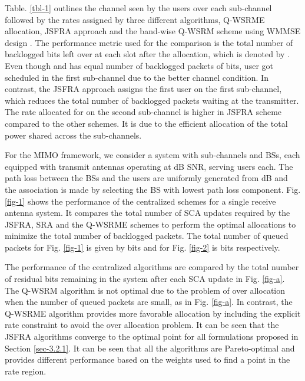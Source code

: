 Table. \ref{tbl-1} outlines the channel seen by the users over each sub-channel followed by the rates assigned by three different algorithms, \ac{Q-WSRME} allocation, \ac{JSFRA} approach and the band-wise \ac{Q-WSRM} scheme using \ac{WMMSE} design \cite{wmmse_shi}. The performance metric used for the comparison is the total number of backlogged bits left over at each slot after the allocation, which is denoted by . Even though  and  has equal number of backlogged packets of  bits, user  got scheduled in the first sub-channel due to the better channel condition. In contrast, the \ac{JSFRA} approach assigns the first user on the first sub-channel, which reduces the total number of backlogged packets waiting at the transmitter. The rate allocated for  on the second sub-channel is higher in \ac{JSFRA} scheme compared to the other schemes. It is due to the efficient allocation of the total power shared across the sub-channels.

For the \ac{MIMO} framework, we consider a system with  sub-channels and  \acp{BS}, each equipped with  transmit antennas operating at dB \ac{SNR}, serving  users each. The path loss between the \acp{BS} and the users are uniformly generated from \me{[0,-3]} dB and the association is made by selecting the \ac{BS} with lowest path loss component. Fig. \ref{fig-1} shows the performance of the centralized schemes for a single receive antenna system. It compares the total number of \ac{SCA} updates required by the \ac{JSFRA}, \ac{SRA} and the \ac{Q-WSRME} schemes to perform the optimal allocations to minimize the total number of backlogged packets. The total number of queued packets for Fig. \ref{fig-1} is given by  bits and for Fig. \ref{fig-2} is  bits respectively.
\begin{figure*}
\centering
{}
\hfill
{}
\caption{Number of backlogged packets at the \ac{SCA} update points}
\label{fig-a}
\end{figure*}

The performance of the centralized algorithms are compared by the total number of residual bits remaining in the system after each \ac{SCA} update in Fig. \ref{fig-a}. The \ac{Q-WSRM} algorithm is not optimal due to the problem of over allocation when the number of queued packets are small, as in Fig. \ref{fig-a}. In contrast, the \ac{Q-WSRME} algorithm provides more favorable allocation by including the explicit rate constraint to avoid the over allocation problem. It can be seen that the \ac{JSFRA} algorithms converge to the optimal point for all formulations proposed in Section \ref{sec-3.2.1}. It can be seen that all the algorithms are Pareto-optimal and provides different performance based on the weights used to find a point in the rate region. 

